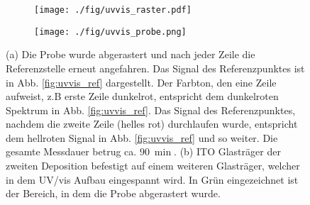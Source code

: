 \begin{figure}
    \begin{subfigure}[b]{0.65\textwidth}
      \texttt{[image: ./fig/uvvis\_raster.pdf]}
      \caption{}
      \label{fig:uvvis_raster}
    \end{subfigure}\hfill
    \begin{subfigure}[b]{0.325\textwidth}
      \texttt{[image: ./fig/uvvis\_probe.png]}
      \caption{}
      \label{fig:uvvis_probe}
    \end{subfigure}
    \caption{(a) Die Probe wurde abgerastert und nach jeder Zeile die Referenzstelle erneut angefahren. Das Signal des Referenzpunktes ist in Abb. \ref{fig:uvvis_ref} dargestellt. Der Farbton, den eine Zeile aufweist, z.B erste Zeile dunkelrot, entspricht dem dunkelroten Spektrum in Abb. \ref{fig:uvvis_ref}. Das Signal des Referenzpunktes, nachdem die zweite Zeile (helles rot) durchlaufen wurde, entspricht dem hellroten Signal in Abb. \ref{fig:uvvis_ref} und so weiter. Die gesamte Messdauer betrug ca. $\SI{90}{\min}$. (b) ITO Glasträger der zweiten Deposition befestigt auf einem weiteren Glasträger, welcher in dem UV/vis Aufbau eingespannt wird. In Grün eingezeichnet ist der Bereich, in dem die Probe abgerastert wurde.} 
    \label{fig:uvvis_ablauf}
\end{figure}
